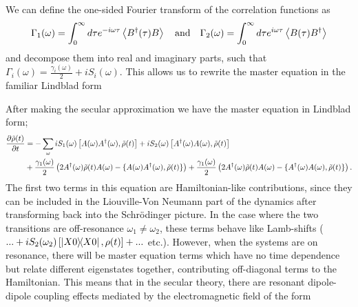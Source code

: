 \documentclass[]{article}
\begin{document}
We can define the one-sided Fourier transform of the correlation functions as 
\begin{equation}
\Gamma_1(\omega) = \int_{0}^{\infty} d\tau e^{-i\omega \tau}\expval{B^{\dagger}(\tau)B} \quad \textnormal{and} \quad \Gamma_2(\omega) = \int_{0}^{\infty} d\tau e^{i\omega \tau}\expval{B(\tau)B^{\dagger}}
\end{equation}
and decompose them into real and imaginary parts, such that $\Gamma_i(\omega) = \frac{\gamma_i(\omega)}{2} + i S_i(\omega)$. This allows us to rewrite the master equation in the familiar Lindblad form

After making the secular approximation we have the master equation in Lindblad form;
\begin{align}
\begin{split}
\pdv{\tilde{\rho}(t)}{t} &= - \sum_{\omega}i S_1(\omega)\left[A(\omega)A^{\dagger}(\omega),\tilde{\rho}(t)\right] + iS_2(\omega)\left[A^{\dagger}(\omega)A(\omega),\tilde{\rho}(t)\right] \\& +\frac{\gamma_1(\omega)}{2}\left(2A^{\dagger}(\omega)\tilde{\rho}(t)A(\omega) - \{A(\omega)A^{\dagger}(\omega), \tilde{\rho}(t)\}\right)+ \frac{\gamma_1(\omega)}{2}\left(2A^{\dagger}(\omega)\tilde{\rho}(t)A(\omega) - \{A^{\dagger}(\omega)A(\omega), \tilde{\rho}(t)\}\right).
\end{split}
\end{align}
The first two terms in this equation are Hamiltonian-like contributions, since they can be included in the Liouville-Von Neumann part of the dynamics after transforming back into the Schr\"odinger picture. In the case where the two transitions are off-resonance $\omega_1 \neq \omega_2$, these terms behave like Lamb-shifts ($...+iS_2(\omega_2)\left[\dyad{X0}, \rho(t)\right]+...$ etc.). However, when the systems are on resonance, there will be master equation terms which have no time dependence but relate different eigenstates together, contributing off-diagonal terms to the Hamiltonian. This means that in the secular theory, there are resonant dipole-dipole coupling effects mediated by the electromagnetic field of the form
\end{document}
